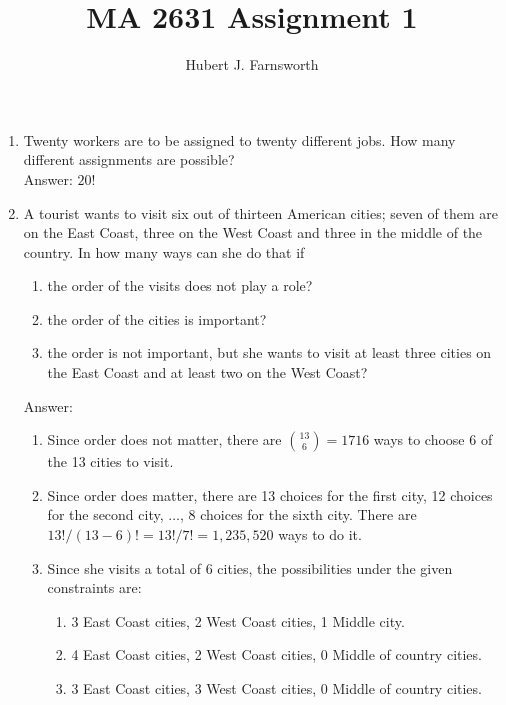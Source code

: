 \documentclass{article}
\title{MA 2631 Assignment 1}
\author{Hubert J. Farnsworth}
\begin{document}
\maketitle

\begin{enumerate}


\item Twenty workers are to be assigned to twenty different jobs. How many different assignments are possible?\\

Answer: $20!$


\item A tourist wants to visit six out of thirteen American cities; seven of them are on the East Coast, three on the West Coast and three in the middle of the country. In how
many ways can she do that if

\begin{enumerate}
\item the order of the visits does not play a role?
\item the order of the cities is important?
\item the order is not important, but she wants to
visit at least three cities on the East Coast and at
least two on the West Coast?
\end{enumerate}

Answer:

\begin{enumerate}
\item Since order does not matter, there are $\binom{13}{6} = 1716$ ways to choose 6 of the 13 cities to visit. 
	
\item Since order does matter, there are 13 choices for the first city, 12 choices for the second city, $\dots$, 8 choices for the sixth city. There are $13! / (13-6)! = 13! / 7! = 1, 235, 520$ ways to do it. 
	
\item Since she visits a total of 6 cities, the possibilities under the given constraints are:

\begin{enumerate}
\item 3 East Coast cities, 2 West Coast cities, 1 Middle city.
\item 4 East Coast cities, 2 West Coast cities, 0 Middle of country cities.
\item 3 East Coast cities, 3 West Coast cities, 0 Middle of country cities.
\end{enumerate}


\end{enumerate}
\end{enumerate}
\end{document}
